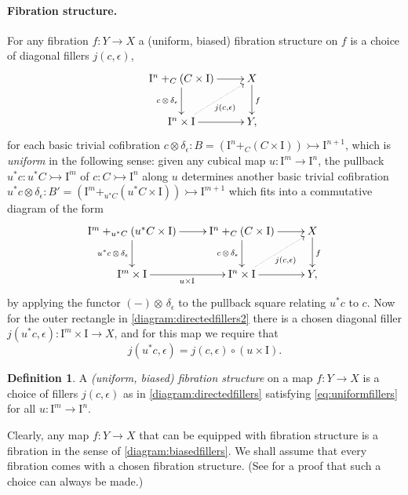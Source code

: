 \documentclass[11pt]{article}
\newcommand{\mono}{\ensuremath{\rightarrowtail}}
\newcommand{\I}{\ensuremath{\mathrm{I}}}
\theoremstyle{remark}
\theoremstyle{definition}
\newtheorem{definition}[theorem]{Definition}
\begin{document}
\paragraph{Fibration structure.} For any fibration $f:Y\to X$ a (uniform, biased) fibration structure on $f$ is a choice of diagonal fillers $j(c,\epsilon)$,
\begin{equation}\label{diagram:directedfillers}
\xymatrix{
\I^n +_C (C\times\I) \ar[d]_{c\,\otimes\,\delta_\epsilon} \ar[r] & X \ar[d]^f \\
\I^{n}\times \I \ar@{.>}[ru]_{j(c,\epsilon)} \ar[r] & Y,
}
\end{equation}
for each basic trivial cofibration $c \otimes \delta_\epsilon : B = (\I^n +_C (C\times\I)) \mono \I^{n+1}$, which is \emph{uniform} in the following sense: given any cubical map $u : \I^m \to \I^n$, the pullback $u^*c : u^*C\mono \I^m$ of $c : C\mono \I^n$ along $u$ determines another basic trivial cofibration $u^*c \otimes \delta_\epsilon : B' = (\I^m +_{u^*C} (u^*C\times\I)) \mono \I^{m+1}$ which fits into a commutative diagram of the form
\begin{equation}\label{diagram:directedfillers2}
\xymatrix{
\I^m +_{u^*C} (u^*C\times\I) \ar[d]_{u^*c\,\otimes\,\delta_\epsilon} \ar[r] & \I^n +_C (C\times\I) \ar[d]_{c\,\otimes\,\delta_\epsilon} \ar[r] & X \ar[d]^f \\
\I^{m}\times \I  \ar[r]_{u\times \I} & \I^{n}\times \I \ar@{.>}[ru]_{j(c,\epsilon)} \ar[r] & Y,
}
\end{equation}
by applying the functor $(-)\otimes\,\delta_\epsilon$ to the pullback square relating $u^*c$ to $c$.  Now for the outer rectangle in \eqref{diagram:directedfillers2} there is a chosen diagonal filler $j(u^*c,\epsilon): \I^m\times\I\to X$, and for this map we require that
\begin{equation}\label{eq:uniformfillers}
j(u^*c,\epsilon) = j(c,\epsilon)\circ (u\times \I).
\end{equation}

\begin{definition} A \emph{(uniform, biased) fibration structure} on a map $f: Y\to X$ is a choice of fillers $j(c,\epsilon)$ as in \eqref{diagram:directedfillers} satisfying \eqref{eq:uniformfillers} for all $u : \I^m\to\I^n$.
\end{definition}

Clearly, any map $f: Y\to X$  that can be equipped with fibration structure is a fibration in the sense of \eqref{diagram:biasedfillers}.  We shall assume that every fibration comes with a chosen fibration structure. (See \cite{GS} for a proof that such a choice can always be made.)  
\end{document}
